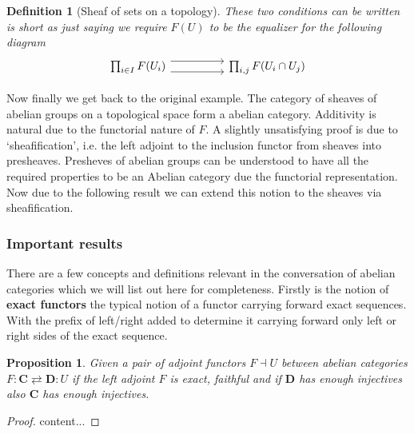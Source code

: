 \documentclass[12pt]{article}
\numberwithin{equation}{section}
\newtheorem{definition}{Definition}[section]
\newtheorem{proposition}{Proposition}[section]
\begin{document}
\begin{appendices}
\begin{enumerate}
\begin{definition}[Sheaf of sets on a topology]
			These two conditions can be written is short as just saying we require $F(U)$ to be the equalizer for the following diagram
			\[\begin{tikzcd}
				{\prod_{i \in I} F(U_i)} && {\prod_{i,j}F(U_i \cap U_j)}
				\arrow[shift right=2, from=1-1, to=1-3]
				\arrow[shift left=2, from=1-1, to=1-3]
			\end{tikzcd}\]
		\end{definition}
		
		Now finally we get back to the original example. The category of sheaves of abelian groups on a topological space form a abelian category. Additivity is natural due to the functorial nature of $F$. A slightly unsatisfying proof is due to `sheafification', i.e. the left adjoint to the inclusion functor from sheaves into presheaves. Presheves of abelian groups can be understood to have all the required properties to be an Abelian category due the functorial representation. Now due to the following result \cite{stacks1} we can extend this notion to the sheaves via sheafification.
	\end{enumerate}
	
	\subsubsection{Important results}
	There are a few concepts and definitions relevant in the conversation of abelian categories which we will list out here for completeness. Firstly is the notion of \textbf{exact functors} the typical notion of a functor carrying forward exact sequences. With the prefix of left/right added to determine it carrying forward only left or right sides of the exact sequence.
	
	
	\begin{proposition}\label{adjointinjective}
		Given a pair of adjoint functors $F \dashv U$ between abelian categories $F:\mathbf{C} \rightleftarrows \mathbf{D}:U$ if the left adjoint $F$ is exact, faithful and if $ \mathbf{D}$ has enough injectives also $\mathbf{C}$ has enough injectives.
	\end{proposition}
	\begin{proof}
		content...
	\end{proof}
	\end{appendices}
	
	
	\appendix
	
	
	
	
	
	
\end{document}
